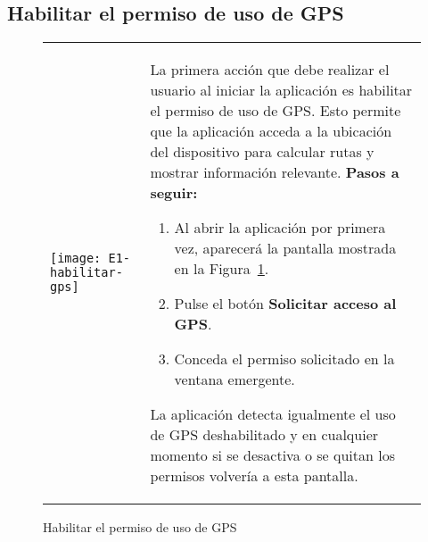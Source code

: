 \subsection{Habilitar el permiso de uso de GPS}
\begin{figure}[H]
	\centering
	\begin{tabular}{m{} m{}}
		\texttt{[image: E1-habilitar-gps]} & 
		\vspace{-10pt}
		
			\begin{flushleft}
				La primera acción que debe realizar el usuario al iniciar la aplicación es habilitar el permiso de uso de GPS. Esto permite que la aplicación acceda a la ubicación del dispositivo para calcular rutas y mostrar información relevante.
				\textbf{Pasos a seguir:}
			\end{flushleft}
			\begin{enumerate}
				\item Al abrir la aplicación por primera vez, aparecerá la pantalla mostrada en la Figura~\ref{fig:habilitarGPS}.
				\item Pulse el botón \textbf{Solicitar acceso al GPS}.
				\item Conceda el permiso solicitado en la ventana emergente.
			\end{enumerate}		
			La aplicación detecta igualmente el uso de GPS deshabilitado y en cualquier momento si se desactiva o se quitan los permisos volvería a esta pantalla.
	\end{tabular}
	\caption{Habilitar el permiso de uso de GPS}
	\label{fig:habilitarGPS}
\end{figure}

\newpage
